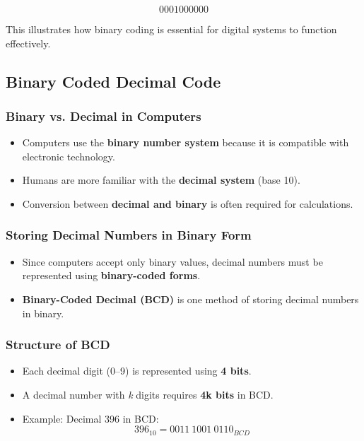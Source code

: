 \documentclass[a4paper,12pt]{article}
\begin{document}
\[
0001000000
\]

This illustrates how binary coding is essential for digital systems to function effectively.

\subsection{Binary Coded Decimal Code}
\subsubsection{Binary vs. Decimal in Computers}
\begin{itemize}
    \item Computers use the \textbf{binary number system} because it is compatible with electronic technology.
    \item Humans are more familiar with the \textbf{decimal system} (base 10).
    \item Conversion between \textbf{decimal and binary} is often required for calculations.
\end{itemize}

\subsubsection{Storing Decimal Numbers in Binary Form}
\begin{itemize}
    \item Since computers accept only binary values, decimal numbers must be represented using \textbf{binary-coded forms}.
    \item \textbf{Binary-Coded Decimal (BCD)} is one method of storing decimal numbers in binary.
\end{itemize}

\subsubsection{Structure of BCD}
\begin{itemize}
    \item Each decimal digit (0--9) is represented using \textbf{4 bits}.
    \item A decimal number with \textit{k} digits requires \textbf{4k bits} in BCD.
    \item Example: Decimal 396 in BCD:
    \begin{equation*}
        396_{10} = 0011\ 1001\ 0110_{BCD}
    \end{equation*}
\end{itemize}
\end{document}
